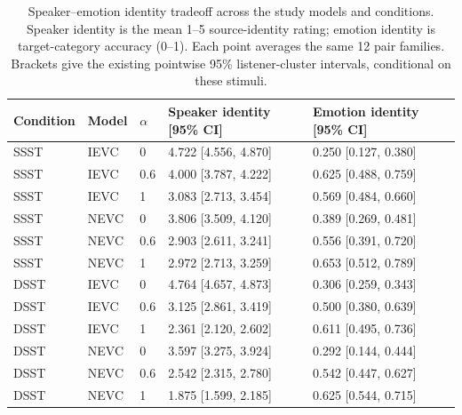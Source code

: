 \begin{table}[t]
\centering\scriptsize
\caption{Speaker--emotion identity tradeoff across the study models and conditions. Speaker identity is the mean 1--5 source-identity rating; emotion identity is target-category accuracy (0--1). Each point averages the same 12 pair families. Brackets give the existing pointwise 95\% listener-cluster intervals, conditional on these stimuli.}
\label{tab:listening-identity}
\setlength{\tabcolsep}{5pt}
\renewcommand{\arraystretch}{1.15}
\begin{tabular}{|lllll|}
\hline
Condition & Model & $\alpha$ & Speaker identity [95\% CI] & Emotion identity [95\% CI] \\
\hline
SSST & IEVC & 0 & 4.722 [4.556, 4.870] & 0.250 [0.127, 0.380] \\
SSST & IEVC & 0.6 & 4.000 [3.787, 4.222] & 0.625 [0.488, 0.759] \\
SSST & IEVC & 1 & 3.083 [2.713, 3.454] & 0.569 [0.484, 0.660] \\
SSST & NEVC & 0 & 3.806 [3.509, 4.120] & 0.389 [0.269, 0.481] \\
SSST & NEVC & 0.6 & 2.903 [2.611, 3.241] & 0.556 [0.391, 0.720] \\
SSST & NEVC & 1 & 2.972 [2.713, 3.259] & 0.653 [0.512, 0.789] \\
DSST & IEVC & 0 & 4.764 [4.657, 4.873] & 0.306 [0.259, 0.343] \\
DSST & IEVC & 0.6 & 3.125 [2.861, 3.419] & 0.500 [0.380, 0.639] \\
DSST & IEVC & 1 & 2.361 [2.120, 2.602] & 0.611 [0.495, 0.736] \\
DSST & NEVC & 0 & 3.597 [3.275, 3.924] & 0.292 [0.144, 0.444] \\
DSST & NEVC & 0.6 & 2.542 [2.315, 2.780] & 0.542 [0.447, 0.627] \\
DSST & NEVC & 1 & 1.875 [1.599, 2.185] & 0.625 [0.544, 0.715] \\
\hline
\end{tabular}
\end{table}
